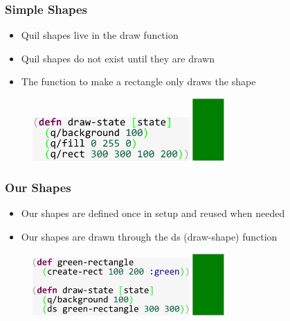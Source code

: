 \documentclass{beamer}
\begin{document}
\begin{frame}
\frametitle{Simple Shapes}
	\begin{itemize}
		\item Quil shapes live in the draw function 
		\item Quil shapes do not exist until they are drawn 	
		\item The function to make a rectangle only draws the shape
\end{itemize}
	\begin{figure}
		\includegraphics[width=6cm]{PresentationImages/quilGreenRect.pdf}
		\hspace{1cm}
		\includegraphics[width=1.2cm]{PresentationImages/ourGreenRect.pdf}
	\end{figure}
\end{frame}

\begin{frame}
\frametitle{Our Shapes}
	\begin{itemize}
		\item Our shapes are defined once in setup and reused when needed
		\item Our shapes are drawn through the ds (draw-shape) function 
	\end{itemize}
	\begin{figure}
		\includegraphics[width=6cm]{PresentationImages/ourGreenRectCode.pdf}
		\hspace{1cm}
		\includegraphics[width=1.2cm]{PresentationImages/ourGreenRect.pdf}
	\end{figure}
\end{frame}
\end{document}
